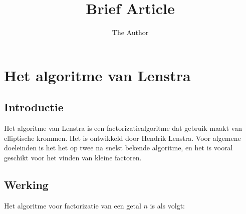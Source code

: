 \documentclass{article}
\title{Brief Article}
\author{The Author}
\begin{document}
\maketitle

\section{Het algoritme van Lenstra}

\subsection{Introductie}

Het algoritme van Lenstra is een factorizatiealgoritme dat gebruik maakt van elliptische krommen. Het is ontwikkeld door Hendrik Lenstra. Voor algemene doeleinden is het het op twee na snelst bekende algoritme, en het is vooral geschikt voor het vinden van kleine factoren.

\subsection{Werking}

Het algoritme voor factorizatie van een getal $n$ is als volgt:
\end{document}
